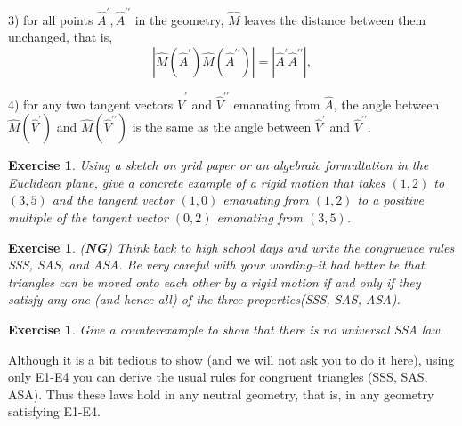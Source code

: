 \documentclass{article}%
\newtheorem{exercise}[theorem]{Exercise}
\begin{document}
3) for all points $\hat{A}^{\prime},\hat{A}^{\prime\prime}$ in the geometry,
$\hat{M}$ leaves the distance between them unchanged, that is,%
\[
\left\vert \hat{M}\left(  \hat{A}^{\prime}\right)  \hat{M}\left(  \hat
{A}^{\prime\prime}\right)  \right\vert =\left\vert \hat{A}^{\prime}\hat
{A}^{\prime\prime}\right\vert ,
\]


4) for any two tangent vectors $\hat{V}^{\prime}$ and $\hat{V}^{\prime\prime}$
emanating from $\hat{A}$, the angle between $\hat{M}\left(  \hat{V}^{\prime
}\right)  $ and $\hat{M}\left(  \hat{V}^{\prime\prime}\right)  $ is the same
as the angle between $\hat{V}^{\prime}$ and $\hat{V}^{\prime\prime}$.

\begin{exercise}
Using a sketch on grid paper or an algebraic formultation in the Euclidean
plane, give a concrete example of a rigid motion that takes $\left(
1,2\right)  $ to $\left(  3,5\right)  $ and the tangent vector $\left(
1,0\right)  $ emanating from $\left(  1,2\right)  $ to a positive multiple of
the tangent vector $\left(  0,2\right)  $ emanating from $\left(  3,5\right)
$.
\end{exercise}

\begin{exercise}
(\textbf{NG}) Think back to high school days and write the congruence rules
SSS, SAS, and ASA. Be very careful with your wording--it had better be that
triangles can be moved onto each other by a rigid motion if and only if they
satisfy any one (and hence all) of the three properties(SSS, SAS, ASA).
\end{exercise}

\begin{exercise}
Give a counterexample to show that there is no universal SSA law.
\end{exercise}

Although it is a bit tedious to show (and we will not ask you to do it here),
using only E1-E4 you can derive the usual rules for congruent triangles (SSS,
SAS, ASA). Thus these laws hold in any neutral geometry, that is, in any
geometry satisfying E1-E4.
\end{document}
